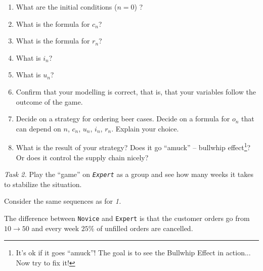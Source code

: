 \begin{enumerate}[label = \emph{(\alph*)}]
\item What are the initial conditions ($n=0$) ?
\item What is the formula for $c_n$?


\item What is the formula for $r_n$? 


\item What is $i_n$?

\item What is $u_n$?


\item Confirm that your modelling is correct, that is, that your variables follow the outcome of the game.

\item Decide on a strategy for ordering beer cases. Decide on a formula for $o_n$ that can depend on $n$, $c_n$, $u_n$, $i_n$, $r_n$.
Explain your choice.

\item What is the result of your strategy? Does it go ``amuck'' -- bullwhip effect\footnote{It's ok if it goes ``amuck''! The goal is to see the Bullwhip Effect in action... Now try to fix it!}? Or does it control the supply chain nicely?

\end{enumerate}


\newpage

\emph{Task 2.} Play the ``game'' on \emph{\tt Expert} as a group and see how many weeks it takes to stabilize the situation.

Consider the same sequences as for \emph{1.} 

The difference between {\tt Novice} and {\tt Expert} is that the customer orders go from $10\to50$ and every week $25\%$ of unfilled orders are cancelled.

